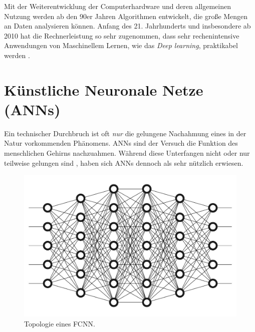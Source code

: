 \documentclass{thesisclass}
\begin{document}
Mit der Weiterentwicklung der Computerhardware und deren allgemeinen Nutzung werden ab den 90er Jahren Algorithmen entwickelt, die große Mengen an Daten analysieren können. Anfang des 21. Jahrhunderts und insbesondere ab 2010 hat die Rechnerleistung so sehr zugenommen, dass sehr rechenintensive Anwendungen von Maschinellem Lernen, wie das  \textit{Deep learning}, praktikabel werden \cite{taigman2014deepface} \cite{microsoftTranslator}.

\let\cleardoublepage\relax \chapter{Künstliche Neuronale Netze (\gls{ANN}s)}

Ein technischer Durchbruch ist oft \textit{nur} die gelungene Nachahmung eines in der Natur vorkommenden Phänomens. \gls{ANN}s sind der Versuch die Funktion des menschlichen Gehirns nachzuahmen. Während diese Unterfangen nicht oder nur teilweise gelungen sind \cite{Adan2018Oct}, haben sich \gls{ANN}s dennoch als sehr nützlich erwiesen.
\begin{figure}[H]
		\center
  		\includegraphics[width=\linewidth]{images/DeepNeuralNetwork.jpg}
  		\caption{Topologie eines \gls{FCNN}.\cite{NeuronalesNetzImage} }
  		\label{fig:Neuronales Netz}
\end{figure}
\end{document}
